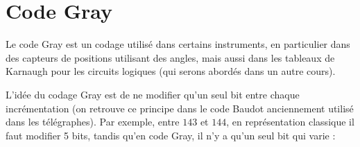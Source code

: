 \documentclass[11pt,a4paper]{article}
\begin{document}

\section{Code Gray}

\bigskip

Le code Gray est un codage utilisé dans certains instruments, en particulier dans des capteurs de positions utilisant des angles, mais aussi dans les tableaux de Karnaugh pour les circuits logiques (qui serons abordés dans un autre cours).

\medskip

L'idée du codage Gray est de ne modifier qu'un seul bit entre chaque incrémentation (on retrouve ce principe dans le code Baudot anciennement utilisé dans les télégraphes).
Par exemple, entre $ 143 $ et $ 144 $, en représentation classique il faut modifier 5 bits, tandis qu'en code Gray, il n'y a qu'un seul bit qui varie :

\medskip
\end{document}
